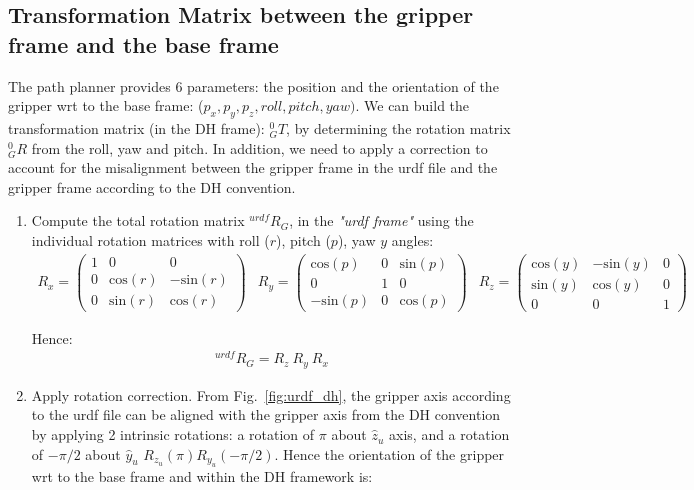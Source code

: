 \documentclass[a4paper,12pt]{report}
\begin{document}
\subsection{Transformation Matrix between the gripper frame and the base frame}
The path planner provides 6 parameters: the position and the orientation of the gripper wrt to the base frame: ($p_x, p_y, p_z, roll, pitch, yaw)$.  We can build the transformation matrix (in the DH frame): $_G ^0T$, by determining the rotation matrix $_G ^0R$ from the roll, yaw and pitch. In addition, we need to apply a correction to account for the misalignment between the gripper frame in the urdf file and the gripper frame according to the DH convention.

\begin{enumerate}
\item Compute the total rotation matrix $^{urdf}R_G$, in the \textit{"urdf frame"} using the individual rotation matrices with roll ($r$), pitch ($p$), yaw $y$  angles:
\begin{align}
R_x = \left( \begin{matrix} 1 & 0 & 0 \\
0 & \text{cos}(r) & -\text{sin}(r) \\
0 & \text{sin}(r) & \text{cos}(r) \end{matrix}\right) & 
R_y = \left( \begin{matrix} \text{cos}(p) & 0 & \text{sin}(p) \\
0 & 1 & 0 \\
-\text{sin}(p) & 0 &  \text{cos}(p) \end{matrix}\right) &
R_z = \left( \begin{matrix} \text{cos}(y) & -\text{sin}(y) & 0 \\
\text{sin}(y) & \text{cos} (y) & 0 \\
0 & 0 & 1 \end{matrix}\right)
\end{align}

Hence:
\begin{align}
^{urdf} R_{G} = R_z \ R_y \ R_x
\end{align}


\item Apply rotation correction. From Fig.~\ref{fig:urdf_dh}, the gripper axis according to the urdf file can be aligned with the gripper axis from the DH convention by applying 2 intrinsic rotations: a rotation  of $\pi$ about $\hat{z}_u$ axis, and a rotation of $-\pi/2$ about $\hat{y}_u$ $R_{z_{u}}(\pi) R_{y_{u}}(-\pi/2)$. Hence the orientation of the gripper wrt to the base frame and within the DH framework is:


\end{enumerate}
\end{document}

